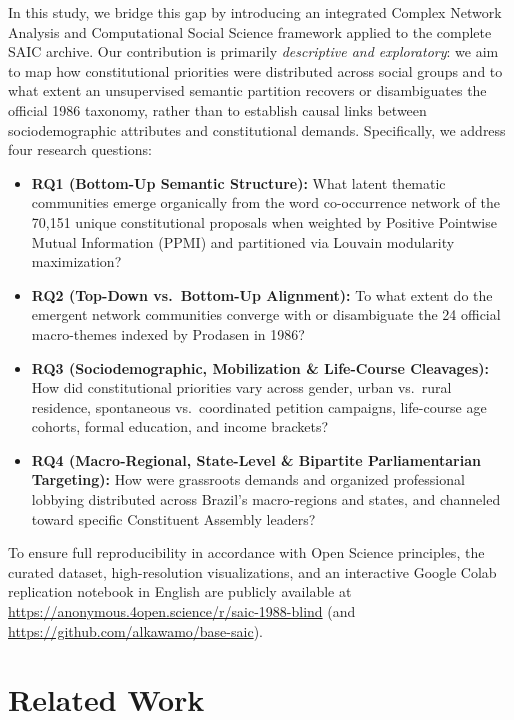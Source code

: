 \documentclass[pdflatex,sn-basic]{sn-jnl}
\begin{document}
In this study, we bridge this gap by introducing an integrated Complex Network Analysis and Computational Social Science framework applied to the complete SAIC archive. %
Our contribution is primarily \emph{descriptive and exploratory}: we aim to map how constitutional priorities were distributed across social groups and to what extent an unsupervised semantic partition recovers or disambiguates the official 1986 taxonomy, rather than to establish causal links between sociodemographic attributes and constitutional demands. Specifically, we address four research questions:
\begin{itemize}
    \item \textbf{RQ1 (Bottom-Up Semantic Structure):} What latent thematic communities emerge organically from the word co-occurrence network of the 70,151 unique constitutional proposals when weighted by Positive Pointwise Mutual Information (PPMI) and partitioned via Louvain modularity maximization?
    \item \textbf{RQ2 (Top-Down vs.\ Bottom-Up Alignment):} To what extent do the emergent network communities converge with or disambiguate the 24 official macro-themes indexed by Prodasen in 1986?
    \item \textbf{RQ3 (Sociodemographic, Mobilization \& Life-Course Cleavages):} How did constitutional priorities vary across gender, urban vs.\ rural residence, spontaneous vs.\ coordinated petition campaigns, life-course age cohorts, formal education, and income brackets?
    \item \textbf{RQ4 (Macro-Regional, State-Level \& Bipartite Parliamentarian Targeting):} How were grassroots demands and organized professional lobbying distributed across Brazil's macro-regions and states, and channeled toward specific Constituent Assembly leaders?
\end{itemize}

To ensure full reproducibility in accordance with Open Science principles, the curated dataset, high-resolution visualizations, and an interactive Google Colab replication notebook in English are publicly available at \url{https://anonymous.4open.science/r/saic-1988-blind} (and \url{https://github.com/alkawamo/base-saic}).

\section{Related Work}\label{sec2}
\end{document}

